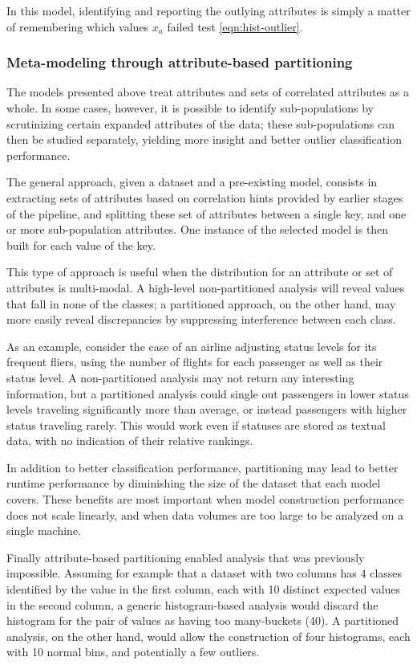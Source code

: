In this model, identifying and reporting the outlying attributes is simply a matter of remembering which values $x_a$ failed test \ref{eqn:hist-outlier}.

\subsubsection{Meta-modeling through attribute-based partitioning}
The models presented above treat attributes and sets of correlated attributes as a whole. In some cases, however, it is possible to identify sub-populations by scrutinizing certain expanded attributes of the data; these sub-populations can then be studied separately, yielding more insight and better outlier classification performance.

The general approach, given a dataset and a pre-existing model, consists in extracting sets of attributes based on correlation hints provided by earlier stages of the pipeline, and splitting these set of attributes between a single key, and one or more sub-population attributes. One instance of the selected model is then built for each value of the key. 

This type of approach is useful when the distribution for an attribute or set of attributes is multi-modal. A high-level non-partitioned analysis will reveal values that fall in none of the classes; a partitioned approach, on the other hand, may more easily reveal discrepancies by suppressing interference between each class.

As an example, consider the case of an airline adjusting status levels for its frequent fliers, using the number of flights for each passenger as well as their status level. A non-partitioned analysis may not return any interesting information, but a partitioned analysis could single out passengers in lower status levels traveling significantly more than average, or instead passengers with higher status traveling rarely. This would work even if statuses are stored as textual data, with no indication of their relative rankings.

In addition to better classification performance, partitioning may lead to better runtime performance by diminishing the size of the dataset that each model covers. These benefits are most important when model construction performance does not scale linearly, and when data volumes are too large to be analyzed on a single machine. 

Finally attribute-based partitioning enabled analysis that was previously impossible. Assuming for example that a dataset with two columns has 4 classes identified by the value in the first column, each with 10 distinct expected values in the second column, a generic histogram-based analysis would discard the histogram for the pair of values as having too many-buckets (40). A partitioned analysis, on the other hand, would allow the construction of four histograms, each with 10 normal bins, and potentially a few outliers.

